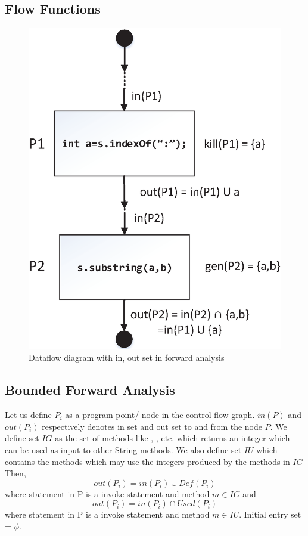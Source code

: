 \subsection{Flow Functions}
\label{subsec:flowFunctions}

\begin{figure}[t]
\centering
\includegraphics[scale=.35]{images/dataflow.eps}
\caption{Dataflow diagram with in, out set in forward analysis}
\label{fig:dataflow}
\end{figure}

\subsection{Bounded Forward Analysis}
\label{subsec:boundedForward}

Let us define $P_i$ as a program point/ node in the control flow graph. $in(P)$
and $out(P_i)$ respectively denotes in set and out set to and from the node $P$.
We define set $IG$ as the set of methods like ,
,  etc. which returns an integer
which can be used as input to other String methods. We also define set $IU$
which contains the methods which may use the integers produced by the methods in
$IG$ Then, 
$$out(P_i) = in(P_i) \cup Def(P_i)$$ where statement in P is a invoke statement
and method $m \in IG$ and
$$out(P_i) = in(P_i) \cap Used(P_i)$$ where statement in P is a invoke statement
and method $m \in IU$. Initial entry set = ${\phi}$.


